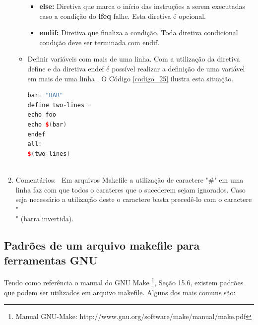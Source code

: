 \begin{enumerate}
\begin{itemize}
\begin{itemize}
        \item \textbf{else:} Diretiva que marca o início das instruções a serem 
    executadas caso a condição do \textbf{ifeq} falhe. Esta diretiva é opcional\cite{ref50}.

        \item \textbf{endif:} Diretiva que finaliza a condição. 
    Toda diretiva condicional condição deve ser terminada com endif\cite{ref50}.
    \end{itemize}

    \item Definir variáveis com mais de uma linha. Com a utilização da diretiva define
 e  da diretiva endef é possível realizar a definição de uma variável em mais
 de uma linha \cite{ref51}. O Código \ref{codigo_25} ilustra esta situação.

    \begin{lstlisting}[language=C++,frame=single,captionpos=b,caption={
						Exemplo Make file com definição de variavel em
													  multiplas linhas},
														label=codigo_25]
bar= "BAR"
define two-lines =
echo foo
echo $(bar)
endef
all:
$(two-lines)
    
    \end{lstlisting}


    \end{itemize}

    \item Comentários: \
Em arquivos Makefile a utilização de caractere "\#" em uma linha faz com
 que todos o carateres que o sucederem sejam ignorados. Caso seja necessário
 a utilização deste o caractere basta precedê-lo com o caractere "\\" 
(barra invertida)\cite{ref48}.

\end{enumerate}


\subsection{Padrões de um arquivo makefile para ferramentas GNU}

    
Tendo como referência o manual do GNU Make \footnote{
Manual GNU-Make: http://www.gnu.org/software/make/manual/make.pdf 
}, Seção 15.6, existem padrões que podem ser utilizados em arquivo
 makefile. Alguns dos mais comuns são:

